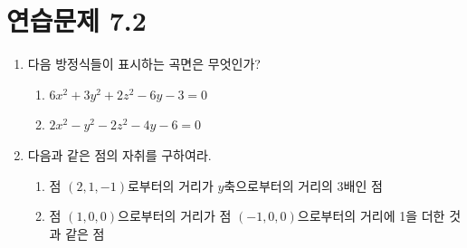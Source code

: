 \documentclass{article}
\theoremstyle{mystyle}
\begin{document}
\section*{연습문제 7.2}
\begin{enumerate}
    \item 다음 방정식들이 표시하는 곡면은 무엇인가?
    \begin{enumerate}
        \item[(1)] \(6x^2+3y^2+2z^2-6y-3=0\)
        \item[(2)] \(2x^2-y^2-2z^2-4y-6=0\)
    \end{enumerate}
    \item 다음과 같은 점의 자취를 구하여라.
    \begin{enumerate}
        \item[(1)] 점 \((2,1,-1)\)로부터의 거리가 \(y\)축으로부터의 거리의 3배인 점
        \item[(2)] 점 \((1,0,0)\)으로부터의 거리가 점 \((-1,0,0)\)으로부터의 거리에 1을 더한 것과 같은 점
    \end{enumerate}
\end{enumerate}
\end{document}
